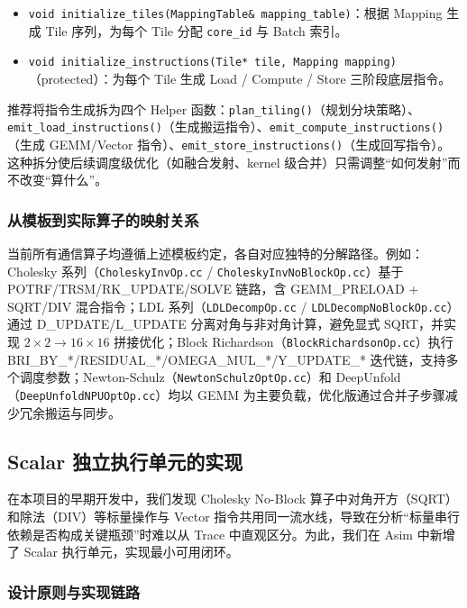 \documentclass{CjC}
\begin{document}
\begin{itemize}
    \item \texttt{void initialize\_tiles(MappingTable\& mapping\_table)}：根据 Mapping 生成 Tile 序列，为每个 Tile 分配 \texttt{core\_id} 与 Batch 索引。
    \item \texttt{void initialize\_instructions(Tile* tile, Mapping mapping)}（protected）：为每个 Tile 生成 Load / Compute / Store 三阶段底层指令。
\end{itemize}

推荐将指令生成拆为四个 Helper 函数：\texttt{plan\_tiling()}（规划分块策略）、\texttt{emit\_load\_instructions()}（生成搬运指令）、\texttt{emit\_compute\_instructions()}（生成 GEMM/Vector 指令）、\texttt{emit\_store\_instructions()}（生成回写指令）。这种拆分使后续调度级优化（如融合发射、kernel 级合并）只需调整“如何发射”而不改变“算什么”。

\subsubsection{从模板到实际算子的映射关系}

当前所有通信算子均遵循上述模板约定，各自对应独特的分解路径。例如：Cholesky 系列（\texttt{CholeskyInvOp.cc} / \texttt{CholeskyInvNoBlockOp.cc}）基于 POTRF/TRSM/RK\_UPDATE/SOLVE 链路，含 GEMM\_PRELOAD + SQRT/DIV 混合指令；LDL 系列（\texttt{LDLDecompOp.cc} / \texttt{LDLDecompNoBlockOp.cc}）通过 D\_UPDATE/L\_UPDATE 分离对角与非对角计算，避免显式 SQRT，并实现 $2\times2\rightarrow16\times16$ 拼接优化；Block Richardson（\texttt{BlockRichardsonOp.cc}）执行 BRI\_BY\_*/RESIDUAL\_*/OMEGA\_MUL\_*/Y\_UPDATE\_* 迭代链，支持多个调度参数；Newton-Schulz（\texttt{NewtonSchulzOptOp.cc}）和 DeepUnfold（\texttt{DeepUnfoldNPUOptOp.cc}）均以 GEMM 为主要负载，优化版通过合并子步骤减少冗余搬运与同步。

\subsection{Scalar 独立执行单元的实现}

在本项目的早期开发中，我们发现 Cholesky No-Block 算子中对角开方（SQRT）和除法（DIV）等标量操作与 Vector 指令共用同一流水线，导致在分析“标量串行依赖是否构成关键瓶颈”时难以从 Trace 中直观区分。为此，我们在 Asim 中新增了 Scalar 执行单元，实现最小可用闭环。

\subsubsection{设计原则与实现链路}
\end{document}
